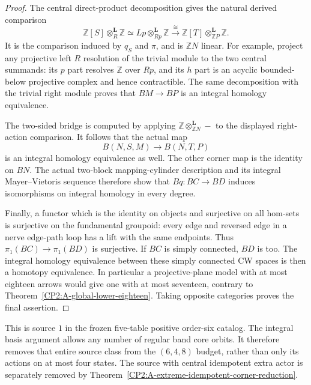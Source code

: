 \begin{proof}
The central direct-product decomposition gives the natural derived
comparison
\[
 \mathbb Z[S]\otimes_R^{\mathbf L}\mathbb Z
 \simeq
 Lp\otimes_{Rp}^{\mathbf L}\mathbb Z
 \xrightarrow{\ \cong\ }
 \mathbb Z[T]\otimes_{\mathbb ZP}^{\mathbf L}\mathbb Z.
\]
It is the comparison induced by $q_S$ and $\pi$, and is
$\mathbb ZN$ linear.  For example, project any projective left
$R$ resolution of the trivial module to the two central summands:
its $p$ part resolves $\mathbb Z$ over $Rp$, and its $h$ part is an
acyclic bounded-below projective complex and hence contractible.
The same decomposition with the trivial right module proves that
$BM\to BP$ is an integral homology equivalence.

The two-sided bridge is computed by applying
$\mathbb Z\otimes_{\mathbb ZN}^{\mathbf L}-$ to the displayed
right-action comparison.  It follows that the actual map
\[
 B(N,S,M)\longrightarrow B(N,T,P)
\]
is an integral homology equivalence as well.  The other corner map
is the identity on $BN$.  The actual two-block mapping-cylinder
description and its integral Mayer--Vietoris sequence therefore show
that $Bq:BC\to BD$ induces isomorphisms on integral homology in every
degree.

Finally, a functor which is the identity on objects and surjective
on all hom-sets is surjective on the fundamental groupoid: every
edge and reversed edge in a nerve edge-path loop has a lift with
the same endpoints.  Thus $\pi_1(BC)\to\pi_1(BD)$ is surjective.
If $BC$ is simply connected, $BD$ is too.  The integral homology
equivalence between these simply connected CW spaces is then a
homotopy equivalence.  In particular a projective-plane model with
at most eighteen arrows would give one with at most seventeen,
contrary to Theorem~\ref{CP2:A-global-lower-eighteen}.  Taking
opposite categories proves the final assertion.
\end{proof}

\begin{remark*}
This is source $1$ in the frozen five-table positive order-six
catalog.  The integral basis argument allows any number of regular
band core orbits.  It therefore removes that entire source class
from the $(6,4,8)$ budget, rather than only its actions on at most
four states.  The source with central idempotent extra actor is
separately removed by Theorem~\ref{CP2:A-extreme-idempotent-corner-reduction}.
\end{remark*}
